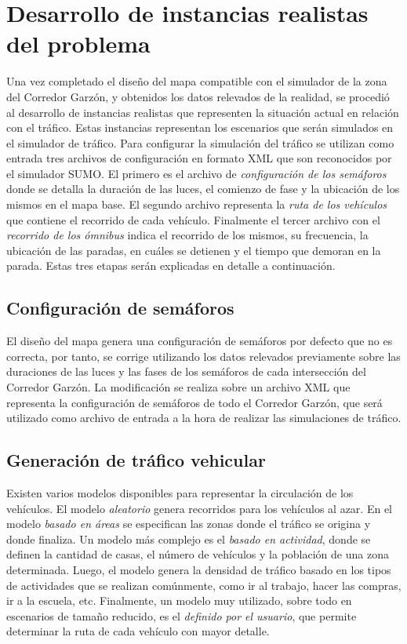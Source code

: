 \section{Desarrollo de instancias realistas del problema}

Una vez completado el diseño del mapa compatible con el simulador de la zona del Corredor Garzón, y obtenidos los datos relevados de la realidad, se procedió al desarrollo de instancias realistas que representen la situación actual en relación con el tráfico. Estas instancias representan los escenarios que serán simulados en el simulador de tráfico. Para configurar la simulación del tráfico se utilizan como entrada tres archivos de configuración en formato XML que son reconocidos por el simulador SUMO. El primero es el archivo de \emph{configuración de los semáforos} donde se detalla la duración de las luces, el comienzo de fase y la ubicación de los mismos en el mapa base. El segundo archivo representa la \emph{ruta de los vehículos} que contiene el recorrido de cada vehículo. Finalmente el tercer archivo con el \emph{recorrido de los ómnibus} indica el recorrido de los mismos, su frecuencia, la ubicación de las paradas, en cuáles se detienen y el tiempo que demoran en la parada. Estas tres etapas serán explicadas en detalle a continuación.

\subsection{Configuración de semáforos}

El diseño del mapa genera una configuración de semáforos por defecto que no es correcta, por tanto, se corrige utilizando los datos relevados previamente sobre las duraciones de las luces y las fases de los semáforos de cada intersección del Corredor Garzón. La modificación se realiza sobre un archivo XML que representa la configuración de semáforos de todo el Corredor Garzón, que será utilizado como archivo de entrada a la hora de realizar las simulaciones de tráfico.

\subsection{Generación de tráfico vehicular}

Existen varios modelos disponibles para representar la circulación de los vehículos. El modelo \emph{aleatorio} genera recorridos para los vehículos al azar. En el modelo \emph{basado en áreas} se especifican las zonas donde el tráfico se origina y donde finaliza. Un modelo más complejo es el \emph{basado en actividad}, donde se definen la cantidad de casas, el número de vehículos y la población de una zona determinada. Luego, el modelo genera la densidad de tráfico basado en los tipos de actividades que se realizan comúnmente, como ir al trabajo, hacer las compras, ir a la escuela, etc. Finalmente, un modelo muy utilizado, sobre todo en escenarios de tamaño reducido, es el \emph{definido por el usuario}, que permite determinar la ruta de cada vehículo con mayor detalle.


